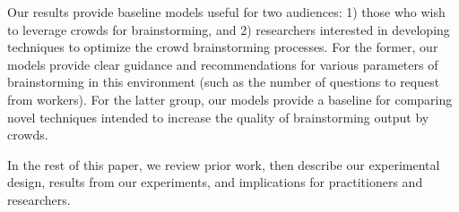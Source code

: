 
Our results provide baseline models useful for two audiences: 1) those who wish to leverage crowds for brainstorming, and 2) researchers interested in developing techniques to optimize the crowd brainstorming processes. For the former, our models provide clear guidance and recommendations for various parameters of brainstorming in this environment (such as the number of questions to request from workers). For the latter group, our models provide a baseline for comparing novel techniques intended to increase the quality of brainstorming output by crowds.




In the rest of this paper, we review prior work, then describe our experimental design, results from our experiments, and implications for practitioners and researchers.
